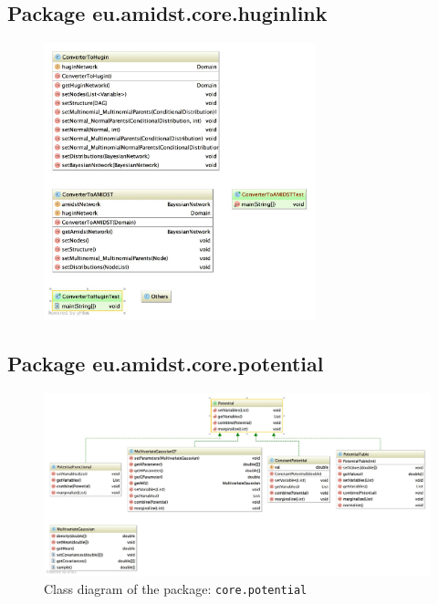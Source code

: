 \subsection{Package eu.amidst.core.huginlink}

\begin{figure}[H]
  \centering
    \includegraphics[width=0.7\textwidth]{ClassDiagrams/core_huginlink.jpg}
\end{figure}


\subsection{Package eu.amidst.core.potential}

\begin{figure}[H]
  \caption{Class diagram of the package: \texttt{core.potential}}
  \centering
    \includegraphics[width=\textwidth]{ClassDiagrams/core_potential.jpg}
\end{figure}

